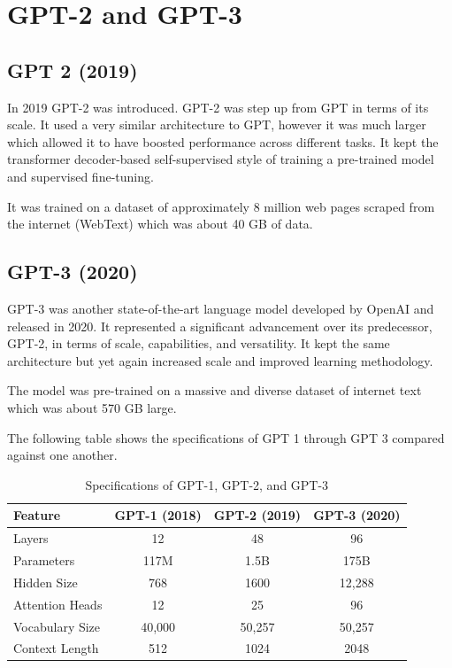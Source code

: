 \documentclass[11pt,twoside]{article}
\begin{document}
\section{GPT-2 and GPT-3}

\subsection{GPT 2 (2019)}
In 2019 GPT-2 was introduced. GPT-2 was step up from GPT in terms of its scale. It used a very similar architecture to GPT, however it was much larger which allowed it to have boosted performance across different tasks. It kept the transformer decoder-based self-supervised style of training a pre-trained model and supervised fine-tuning.

It was trained on a dataset of approximately 8 million web pages scraped from the internet (WebText) which was about 40 GB of data.

\subsection{GPT-3 (2020)}
GPT-3 was another state-of-the-art language model developed by OpenAI and released in 2020. It represented a significant advancement over its predecessor, GPT-2, in terms of scale, capabilities, and versatility. It kept the same architecture but yet again increased scale and improved learning methodology.

The model was pre-trained on a massive and diverse dataset of internet text which was about 570 GB large.

The following table shows the specifications of GPT 1 through GPT 3 compared against one another. \\

\begin{table}[H]
\centering
\renewcommand{\arraystretch}{1.5}
\setlength{\tabcolsep}{12pt}
\begin{tabular}{@{}lccc@{}}
\toprule
\textbf{Feature}       & \textbf{GPT-1 (2018)}     & \textbf{GPT-2 (2019)}       & \textbf{GPT-3 (2020)}       \\ \midrule
Layers                 & 12                 & 48                   & 96                   \\
Parameters             & 117M               & 1.5B                 & 175B                 \\
Hidden Size            & 768                & 1600                 & 12,288               \\
Attention Heads        & 12                 & 25                   & 96                   \\
Vocabulary Size        & 40,000             & 50,257               & 50,257               \\
Context Length         & 512                & 1024                 & 2048                 \\ \bottomrule
\end{tabular}
\caption{Specifications of GPT-1, GPT-2, and GPT-3}
\label{tab:gpt_specs}
\end{table}
\end{document}
